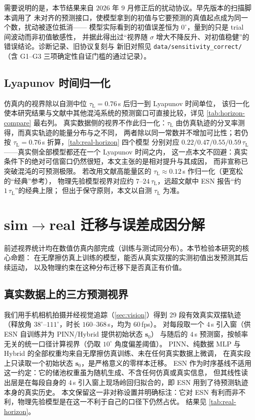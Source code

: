 \documentclass[a4paper,12pt]{ctexart}   %
\newcommand{\tauL}{\tau_{\mathrm{L}}}              %
\renewcommand{\emph}[1]{#1}
\begin{document}
需要说明的是，本节结果来自 $2026$ 年 $9$ 月修正后的扰动协议。早先版本的扫描脚本调用了
未对齐的预测接口，使模型拿到的初值与它要预测的真值起点成为同一个数，扰动被逐位抵消——
模型实际看到的初值误差恒为 $0^\circ$，量到的只是 trial 间波动而非初值敏感性，
并据此得出过“视界随 $\sigma$ 增大不降反升、对初值稳健”的错误结论。诊断记录、旧协议复刻与
新旧对照见 \texttt{data/sensitivity\_correct/}（含 G1--G3 三项确定性自证门槛的通过记录）。

\subsection{Lyapunov 时间归一化}
\label{sec:results-lyapunov}
仿真内的视界除以自测中位 $\tauL = 0.76$\,s 后归一到 Lyapunov 时间单位，
该归一化使本研究结果与文献中其他混沌系统的预测窗口可直接比较，详见 \cref{tab:horizon-compare} 最右列。
真实数据侧的视界不作此归一化：$\tauL$ 由仿真轨迹的分叉率测得，而真实轨迹的能量分布与之不同，
两者除以同一常数并不增加可比性；若仍按 $\tauL = 0.76$\,s 折算，\cref{tab:real-horizon} 四个模型
分别对应 $0.22 / 0.47 / 0.55 / 0.59\,\tauL$——真实侧全部模型都还在一个 Lyapunov 时间之内，
这一点本文不回避：真实条件下的绝对可信窗口仍然很短，本文主张的是\emph{相对提升}与其成因，
而非宣称已突破混沌的可预测极限。
若改用文献高能量区的 $\tauL \approx 0.12$\,s 作归一化（更宽松的“经典”参考），
物理先验模型视界对应约 $7\text{--}24\,\tauL$，远超文献中 ESN 报告“约 $1\,\tauL$”的经典上限；
但出于保守原则，本文以自测 $\tauL$ 为准。

\section{sim$\to$real 迁移与误差成因分解}
\label{sec:sim2real}

前述视界统计均在数值仿真内部完成（训练与测试同分布）。本节检验本研究的核心命题：
在无摩擦仿真上训练的模型，能否从真实双摆的实测初值出发预测其后续运动，
以及物理约束在这种\emph{分布迁移}下是否真正有价值。

\subsection{真实数据上的三方预测视界}
\label{sec:sim2real-horizon}

我们用手机相机拍摄并经视觉追踪（\cref{sec:vision}）得到 29 段有效真实双摆轨迹
（释放角 $38^\circ$--$111^\circ$，时长 $160$--$368$\,s，均为 60\,fps）。
对每段取一个 $4$\,s 引入窗（供 ESN 自训练并为 PINN/Hybrid 提供初始状态 $\bm{s}_0$）
与随后的 $4$\,s 预测窗，按帧率无关的统一口径计算视界（仍取 $10^\circ$ 角度偏差阈值）。
PINN、纯数据 MLP 与 Hybrid 的全部权重均来自无摩擦仿真训练、未在任何真实数据上微调，
在真实段上只读取一个初始状态 $\bm{s}_0$，是严格意义的零样本迁移。
ESN 作为时序基线不适用这一约定：它的储池权重虽为随机生成、不含任何仿真或真实信息，
但其线性读出层是在每段自身的 $4$\,s 引入窗上现场岭回归拟合的，即 ESN 用到了待预测轨迹本身的真实历史。
本文保留这一非对称设置并明确标注：它对 ESN 有利而非不利，物理先验模型是在这一不利于自己的口径下仍然占优。
结果见 \cref{tab:real-horizon}。
\end{document}
